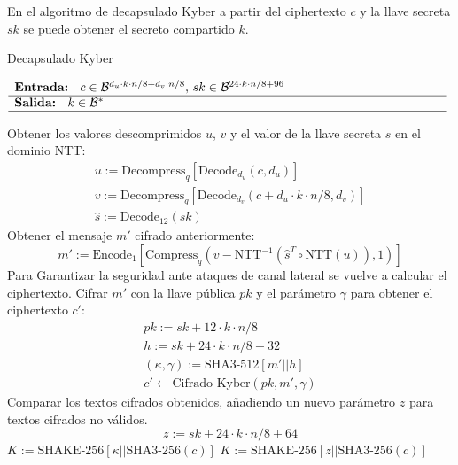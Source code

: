 En el algoritmo de decapsulado Kyber a partir del ciphertexto \(c\)  y la llave secreta \(sk\) se puede obtener el secreto compartido \(k\).
\begin{algorithm}[H]
	\small
	\caption{Decapsulado Kyber}
	$\begin{array}{p{\textwidth}}
		\textbf{Entrada: } \(c\in \mathcal{B}^{d_u\cdot k\cdot n/8+d_v\cdot n/8}\), \(sk\in \mathcal{B}^{24\cdot k\cdot n/8+96}\)\\ 
		\hline
		\textbf{Salida: } \(k\in \mathcal{B}^{*}\)\\ 
		\hline
	\end{array}$
	\begin{algorithmic}[1]
		\State Obtener los valores descomprimidos \(u\), \(v\) y el valor de la llave secreta \(s\) en el dominio NTT:
		\begin{equation}
			\begin{array}{l}
				u:=\text{Decompress}_q[\text{Decode}_{d_u}(c,d_u)]\\
				v:=\text{Decompress}_q[\text{Decode}_{d_v}(c+d_u\cdot k\cdot n/8,d_v)]\\
				\hat{s}:=\text{Decode}_{12}(sk)
			\end{array}
		\end{equation}
		\State Obtener el mensaje \(m'\) cifrado anteriormente:
		\begin{equation}
			m':=\text{Encode}_1[\text{Compress}_q\left(v-\text{NTT}^{-1}(\hat{s}^T\circ \text{NTT}(u)),1\right)]
		\end{equation}
		\Statex Para Garantizar la seguridad ante ataques de canal lateral se vuelve a calcular el ciphertexto.
		\State Cifrar \(m'\) con la llave pública \(pk\) y el parámetro \(\gamma\) para obtener el ciphertexto \(c'\):
		\begin{equation}
			\begin{array}{l}
				pk:=sk+12\cdot k\cdot n/8\\
				h:=sk+24\cdot k\cdot n/8+32\\
				(\kappa, \gamma):=\text{SHA3-512}[m'||h]\\
				c'\gets \text{Cifrado Kyber}(pk,m',\gamma)
			\end{array}
		\end{equation}
		\State Comparar los textos cifrados obtenidos, añadiendo un nuevo parámetro \(z\) para textos cifrados no válidos.
		\begin{equation}
			z:=sk+24\cdot k \cdot n/8 +64
		\end{equation}
		\State \Return \(K:=\text{SHAKE-256}[\kappa||\text{SHA3-256}(c)]\) 
		\Else
		\State \Return \(K:=\text{SHAKE-256}[z||\text{SHA3-256}(c)]\) 
		\EndIf
	\end{algorithmic}
\end{algorithm}
\newpage

